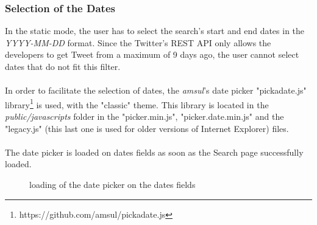 \documentclass[a4paper,11pt]{report}
\begin{document}
\subsubsection{Selection of the Dates}
In the static mode, the user has to select the search's start and end dates in the \emph{YYYY-MM-DD} format. Since the Twitter's REST API only allows the developers to get Tweet from a maximum of 9 days ago, the user cannot select dates that do not fit this filter.\\\\
In order to facilitate the selection of dates, the \emph{amsul}'s date picker "pickadate.js" library\footnote{https://github.com/amsul/pickadate.js} is used, with the "classic" theme. This library is located in the \emph{public/javascripts} folder in the "picker.min.js", "picker.date.min.js" and the "legacy.js" (this last one is used for older versions of Internet Explorer) files.\\\\
The date picker is loaded on dates fields as soon as the Search page successfully loaded.
\begin{figure}[H]
\vspace{-5pt}
\begin{center}
\vspace{-5pt}
\caption{loading of the date picker on the dates fields}
\end{center}
\end{figure}
\vspace{-10pt}
\newpage
\end{document}
